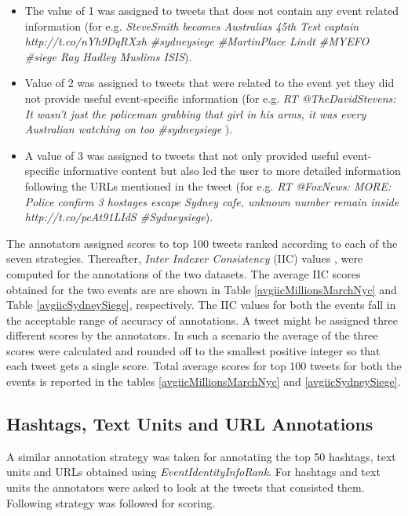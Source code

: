 \begin{itemize}
\item The value of 1 was assigned to tweets that does not contain any event related information (for e.g. \textit{SteveSmith becomes Australias 45th Test captain http://t.co/nYh9DqRXxh \#sydneysiege \#MartinPlace Lindt \#MYEFO \#siege Ray Hadley Muslims ISIS}). 
\item Value of 2 was assigned to tweets that were related to the event yet they did not provide useful event-specific information (for e.g. \textit{RT @TheDavidStevens: It wasn't just the policeman grabbing that girl in his arms, it was every Australian watching on too \#sydneysiege} ). 
\item A value of 3 was assigned to tweets that not only provided useful event-specific informative content but also led the user to more detailed information following the URLs mentioned in the tweet (for e.g. \textit{RT @FoxNews: MORE: Police confirm 3 hostages escape Sydney cafe, unknown number remain inside http://t.co/pcAt91LIdS \#Sydneysiege}).  
\end{itemize}



The annotators assigned scores to top 100 tweets ranked according to each of the seven strategies. Thereafter, \textit{Inter Indexer Consistency} (IIC) values \cite{rolling1981indexing}, were computed for the annotations of the two datasets. The average IIC scores obtained for the two events are are shown in Table \ref{avgiicMillionsMarchNyc} and Table \ref{avgiicSydneySiege}, respectively. The IIC values for both the events fall in the acceptable range of accuracy of annotations. A tweet might be assigned three different scores by the annotators. In such a scenario the average of the three scores were calculated and rounded off to the smallest positive integer so that each tweet gets a single score. Total average scores for top 100 tweets for both the events is reported in the tables \ref{avgiicMillionsMarchNyc} and \ref{avgiicSydneySiege}. 

\subsection{Hashtags, Text Units and URL Annotations}
A similar annotation strategy was taken for annotating the top 50 hashtags, text units and URLs obtained using \textit{EventIdentityInfoRank}. For hashtags and text units the annotators were asked to look at the tweets that consisted them. Following strategy was followed for scoring.


